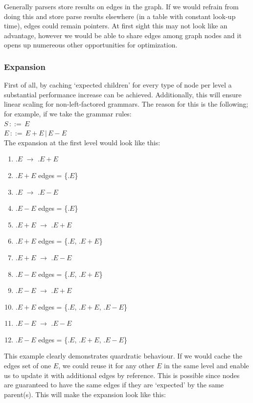 \documentclass[a4paper,10pt]{article}
\begin{document}
Generally parsers store results on edges in the graph. If we would refrain from doing this and store parse results elsewhere (in a table with constant look-up time), edges could remain pointers. At first sight this may not look like an advantage, however we would be able to share edges among graph nodes and it opens up numereous other opportunities for optimization.

\subsubsection{Expansion}
\label{subsec:nodeExpansionOptimization}
First of all, by caching `expected children' for every type of node per level a substantial performance increase can be achieved. Additionally, this will ensure linear scaling for non-left-factored grammars. The reason for this is the following; for example, if we take the grammar rules:\\
$S\,::=\,E$\\
$E\,::=\,E + E\,|\,E - E$\\
The expansion at the first level would look like this:
\begin{enumerate}
 \setlength{\itemsep}{0pt}
 \setlength{\parskip}{0pt}
 \setlength{\parsep}{0pt}
 
 \item $.E$ $\rightarrow$ $.E+E$
 \item $.E+E$ edges = \{$.E$\}
 \item $.E$ $\rightarrow$ $.E-E$
 \item $.E-E$ edges = \{$.E$\}
 \item $.E+E$ $\rightarrow$ $.E+E$
 \item $.E+E$ edges = \{$.E$, $.E+E$\}
 \item $.E+E$ $\rightarrow$ $.E-E$
 \item $.E-E$ edges = \{$.E$, $.E+E$\}
 \item $.E-E$ $\rightarrow$ $.E+E$
 \item $.E+E$ edges = \{$.E$, $.E+E$, $.E-E$\}
 \item $.E-E$ $\rightarrow$ $.E-E$
 \item $.E-E$ edges = \{$.E$, $.E+E$, $.E-E$\}
\end{enumerate}
This example clearly demonstrates quardratic behaviour. If we would cache the edges set of one $E$, we could reuse it for any other $E$ in the same level and enable us to update it with additional edges by reference. This is possible since nodes are guaranteed to have the same edges if they are `expected' by the same parent(s). This will make the expansion look like this:
\end{document}
